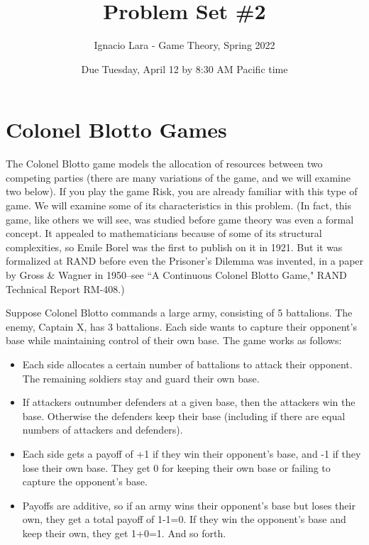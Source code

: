\documentclass[10pt]{article}
\title{Problem Set \#2}
\author{Ignacio Lara - Game Theory, Spring 2022}
\date{Due Tuesday, April 12 by 8:30 AM Pacific time}
\begin{document}
\maketitle


\section{Colonel Blotto Games}

The Colonel Blotto game models the allocation of resources between two competing parties (there are many variations of the game, and we will examine two below). If you play the game Risk, you are already familiar with this type of game. We will examine some of its characteristics in this problem. (In fact, this game, like others we will see, was studied before game theory was even a formal concept. It appealed to mathematicians because of some of its structural complexities, so Emile Borel was the first to publish on it in 1921. But it was formalized at RAND before even the Prisoner's Dilemma was invented, in a paper by Gross \& Wagner in 1950--see ``A Continuous Colonel Blotto Game," RAND Technical Report RM-408.)

Suppose Colonel Blotto commands a large army, consisting of 5 battalions. The enemy, Captain X, has 3 battalions. Each side wants to capture their opponent's base while maintaining control of their own base. The game works as follows:
\begin{itemize}
\item Each side allocates a certain number of battalions to attack their opponent. The remaining soldiers stay and guard their own base.
\item If attackers outnumber defenders at a given base, then the attackers win the base. Otherwise the defenders keep their base (including if there are equal numbers of attackers and defenders).
\item Each side gets a payoff of +1 if they win their opponent's base, and -1 if they lose their own base. They get 0 for keeping their own base or failing to capture the opponent's base.
\item Payoffs are additive, so if an army wins their opponent's base but loses their own, they get a total payoff of 1-1=0. If they win the opponent's base and keep their own, they get 1+0=1. And so forth.
\end{itemize}
\end{document}
